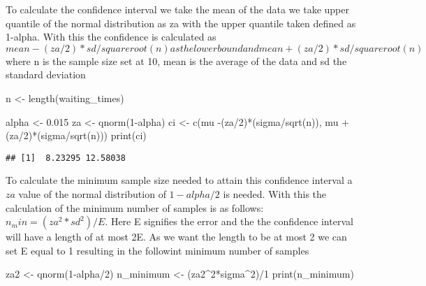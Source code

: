 \documentclass[
]{article}
\newenvironment{Shaded}{\begin{snugshade}}{\end{snugshade}}
\newcommand{\DecValTok}[1]{\textcolor[rgb]{0.00,0.00,0.81}{#1}}
\newcommand{\FloatTok}[1]{\textcolor[rgb]{0.00,0.00,0.81}{#1}}
\newcommand{\FunctionTok}[1]{\textcolor[rgb]{0.00,0.00,0.00}{#1}}
\newcommand{\NormalTok}[1]{#1}
\newcommand{\OtherTok}[1]{\textcolor[rgb]{0.56,0.35,0.01}{#1}}
\newcommand{\SpecialCharTok}[1]{\textcolor[rgb]{0.00,0.00,0.00}{#1}}
\begin{document}
To calculate the confidence interval we take the mean of the data we
take upper quantile of the normal distribution as za with the upper
quantile taken defined as 1-alpha. With this the confidence is
calculated as
\(mean - (za/2)*sd/squareroot(n) as the lower bound and mean + (za/2)*sd/squareroot(n)\)
where n is the sample size set at 10, mean is the average of the data
and sd the standard deviation

\begin{Shaded}
\begin{Highlighting}[]
\NormalTok{n }\OtherTok{\textless{}{-}} \FunctionTok{length}\NormalTok{(waiting\_times)}

\NormalTok{alpha }\OtherTok{\textless{}{-}} \FloatTok{0.015}
\NormalTok{za }\OtherTok{\textless{}{-}} \FunctionTok{qnorm}\NormalTok{(}\DecValTok{1}\SpecialCharTok{{-}}\NormalTok{alpha)}
\NormalTok{ci }\OtherTok{\textless{}{-}} \FunctionTok{c}\NormalTok{(mu }\SpecialCharTok{{-}}\NormalTok{(za}\SpecialCharTok{/}\DecValTok{2}\NormalTok{)}\SpecialCharTok{*}\NormalTok{(sigma}\SpecialCharTok{/}\FunctionTok{sqrt}\NormalTok{(n)), mu }\SpecialCharTok{+}\NormalTok{ (za}\SpecialCharTok{/}\DecValTok{2}\NormalTok{)}\SpecialCharTok{*}\NormalTok{(sigma}\SpecialCharTok{/}\FunctionTok{sqrt}\NormalTok{(n)))}
\FunctionTok{print}\NormalTok{(ci)}
\end{Highlighting}
\end{Shaded}

\begin{verbatim}
## [1]  8.23295 12.58038
\end{verbatim}

To calculate the minimum sample size needed to attain this confidence
interval a \(za\) value of the normal distribution of \(1-alpha/2\) is
needed. With this the calculation of the minimum number of samples is as
follows: \(n_min = (za^2*sd^2)/E\). Here E signifies the error and the
the confidence interval will have a length of at most 2E. As we want the
length to be at most 2 we can set E equal to 1 resulting in the
followint minimum number of samples

\begin{Shaded}
\begin{Highlighting}[]
\NormalTok{za2 }\OtherTok{\textless{}{-}} \FunctionTok{qnorm}\NormalTok{(}\DecValTok{1}\SpecialCharTok{{-}}\NormalTok{alpha}\SpecialCharTok{/}\DecValTok{2}\NormalTok{)}
\NormalTok{n\_minimum }\OtherTok{\textless{}{-}}\NormalTok{ (za2}\SpecialCharTok{\^{}}\DecValTok{2}\SpecialCharTok{*}\NormalTok{sigma}\SpecialCharTok{\^{}}\DecValTok{2}\NormalTok{)}\SpecialCharTok{/}\DecValTok{1}
\FunctionTok{print}\NormalTok{(n\_minimum)}
\end{Highlighting}
\end{Shaded}
\end{document}
